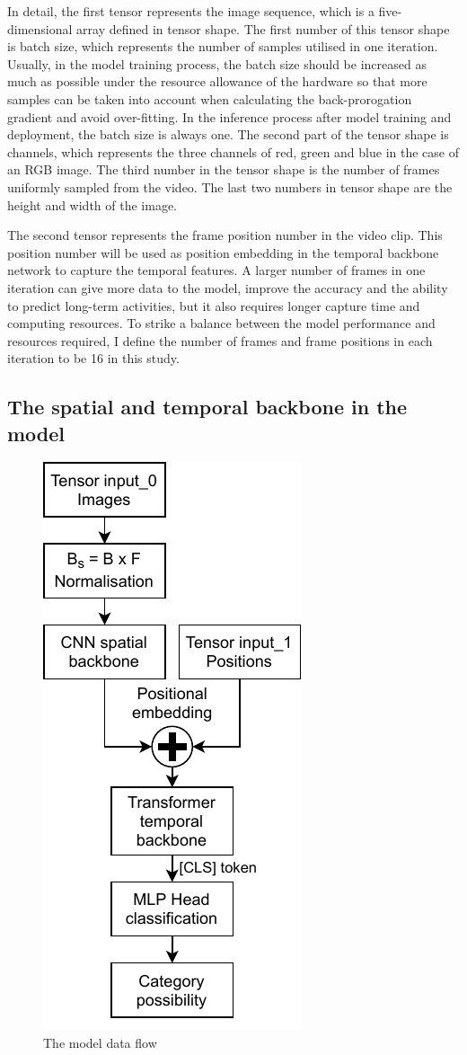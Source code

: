 In detail, the first tensor represents the image sequence, which is a five-dimensional array defined in tensor shape.
The first number of this tensor shape is batch size, which represents the number of samples utilised in one iteration.
Usually, in the model training process, the batch size should be increased as much as possible under the resource allowance of the hardware so that more samples can be taken into account when calculating the back-prorogation gradient and avoid over-fitting.
In the inference process after model training and deployment, the batch size is always one.
The second part of the tensor shape is channels, which represents the three channels of red, green and blue in the case of an RGB image.
The third number in the tensor shape is the number of frames uniformly sampled from the video.
The last two numbers in tensor shape are the height and width of the image.

The second tensor represents the frame position number in the video clip.
This position number will be used as position embedding in the temporal backbone network to capture the temporal features.
A larger number of frames in one iteration can give more data to the model, improve the accuracy and the ability to predict long-term activities, but it also requires longer capture time and computing resources.
To strike a balance between the model performance and resources required, I define the number of frames and frame positions in each iteration to be 16 in this study.

\subsection{The spatial and temporal backbone in the model}
\begin{figure}
    \vspace*{-1.5em}
    \centering
    \includegraphics[width=.33\textwidth]{design/imgs/3-model-dataflow.pdf}
    \caption{The model data flow}
    \label{fig:3-model-dataflow}
\end{figure}

